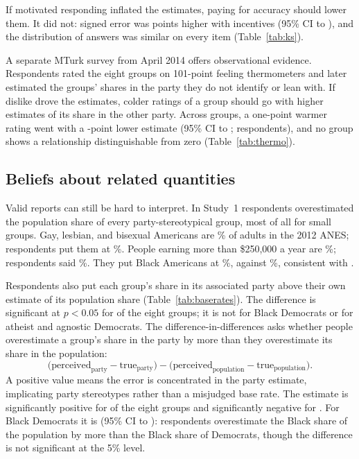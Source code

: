 \documentclass[11pt]{article}
\begin{document}
If motivated responding inflated the estimates, paying for accuracy should lower them. It did not: signed error was \incEffect{} points higher with incentives (95\% CI \incLo{} to \incHi), and the distribution of answers was similar on every item (Table~\ref{tab:ks}).

A separate MTurk survey from April 2014 \citep{ahler2018} offers observational evidence. Respondents rated the eight groups on 101-point feeling thermometers and later estimated the groups' shares in the party they do not identify or lean with. If dislike drove the estimates, colder ratings of a group should go with higher estimates of its share in the other party. Across groups, a one-point warmer rating went with a \thermoPooled-point lower estimate (95\% CI \thermoLo{} to \thermoHi; \thermoN{} respondents), and no group shows a relationship distinguishable from zero (Table~\ref{tab:thermo}).

\subsection{Beliefs about related quantities}

Valid reports can still be hard to interpret. In Study~1 respondents overestimated the population share of every party-stereotypical group, most of all for small groups. Gay, lesbian, and bisexual Americans are \lgbBaseTrue\% of adults in the 2012 ANES; respondents put them at \lgbBasePerceived\%. People earning more than \$250,000 a year are \richBaseTrue\%; respondents said \richBasePerceived\%. They put Black Americans at \blackBasePerceived\%, against \blackBaseTrue\%, consistent with \citet{wong2007}.

Respondents also put each group's share in its associated party above their own estimate of its population share (Table~\ref{tab:baserates}). The difference is significant at $p<0.05$ for \gapSigCount{} of the eight groups; it is not for Black Democrats or for atheist and agnostic Democrats. The difference-in-differences asks whether people overestimate a group's share in the party by more than they overestimate its share in the population:
\[
\bigl(\text{perceived}_{\text{party}} - \text{true}_{\text{party}}\bigr) - \bigl(\text{perceived}_{\text{population}} - \text{true}_{\text{population}}\bigr).
\]
A positive value means the error is concentrated in the party estimate, implicating party stereotypes rather than a misjudged base rate. The estimate is significantly positive for \ddPosCount{} of the eight groups and significantly negative for \ddNegCount. For Black Democrats it is \ddBlack{} (95\% CI \ddBlackLo{} to \ddBlackHi): respondents overestimate the Black share of the population by more than the Black share of Democrats, though the difference is not significant at the 5\% level.
\end{document}
